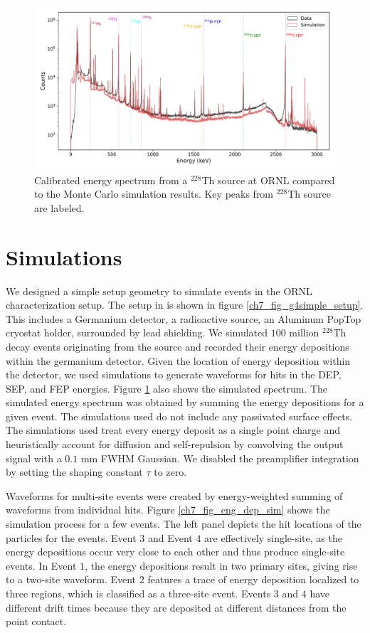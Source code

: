 \begin{figure}%
\centering
    \includegraphics[width=0.99\linewidth,trim={0.5cm 0pc 0.5cm 0pc},clip]{ch7/figs/energy_spectrum_comparison.pdf}
    \caption{Calibrated energy spectrum from a $^{228}$Th source at ORNL compared to the Monte Carlo simulation results. Key peaks from $^{228}$Th source are labeled.}
   \label{ch7_fig_eng_spec_comp}
\end{figure}

\section{Simulations}
We designed a simple {\geant} setup geometry to simulate events in the ORNL characterization setup. The setup in {\geant} is shown in figure \ref{ch7_fig_g4simple_setup}. This includes a Germanium detector, a radioactive source, an Aluminum PopTop cryostat holder, surrounded by lead shielding. We simulated $100$ million $^{228}$Th decay events originating from the source and recorded their energy depositions within the germanium detector. Given the location of energy deposition within the detector, we used {\siggen} simulations to generate waveforms for hits in the DEP, SEP, and FEP energies. Figure \ref{ch7_fig_eng_spec_comp} also shows the simulated spectrum. The simulated energy spectrum was obtained by summing the energy depositions for a given event. The {\siggen} simulations used do not include any passivated surface effects. The {\siggen} simulations used treat every energy deposit as a single point charge and heuristically account for diffusion and self-repulsion by convolving the output signal with a $0.1$ mm FWHM Gaussian. We disabled the preamplifier integration by setting the shaping constant $\tau$ to zero.

Waveforms for multi-site events were created by energy-weighted summing of waveforms from individual hits. Figure \ref{ch7_fig_eng_dep_sim} shows the simulation process for a few events. The left panel depicts the hit locations of the particles for the events. Event $3$ and Event $4$ are effectively single-site, as the energy depositions occur very close to each other and thus produce single-site events. In Event $1$, the energy depositions result in two primary sites, giving rise to a two-site waveform. Event $2$ features a trace of energy deposition localized to three regions, which is classified as a three-site event. Events $3$ and $4$ have different drift times because they are deposited at different distances from the point contact.


